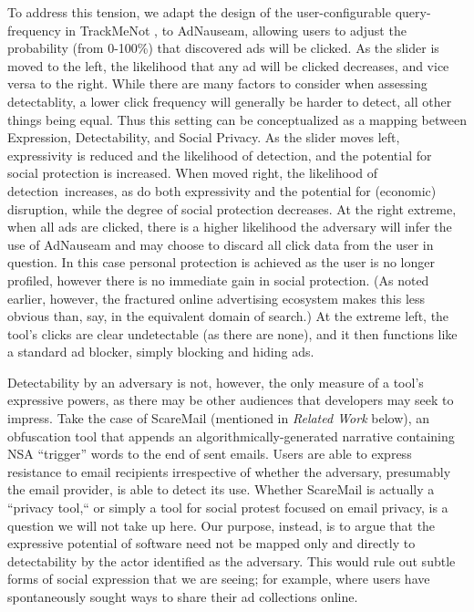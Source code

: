 \documentclass[conference]{IEEEtran}
\begin{document}
To address this tension, we adapt the design of the user-configurable query-frequency in TrackMeNot \cite{Howe-1}, to AdNauseam, allowing users to adjust the probability (from 0-100\%) that discovered ads will be clicked. As the slider is moved to the left, the likelihood that any ad will be clicked decreases, and vice versa to the right. While there are many factors to consider when assessing detectablity, a lower click frequency will generally be harder to detect, all other things being equal. Thus this setting can be conceptualized as a mapping between Expression, Detectability, and Social Privacy. As the slider moves left, expressivity is reduced and the likelihood of detection, and the potential for social protection is increased. When moved right, the likelihood of detection increases, as do both expressivity and the potential for (economic) disruption, while the degree of social protection decreases. At the right extreme, when all ads are clicked, there is a higher likelihood the adversary will infer the use of AdNauseam and may choose to discard all click data from the user in question. In this case personal protection is achieved as the user is no longer profiled, however there is no immediate gain in social protection. (As noted earlier, however, the fractured online advertising ecosystem makes this less obvious than, say, in the equivalent domain of search.) At the extreme left, the tool's clicks are clear undetectable (as there are none), and it then functions like a standard ad blocker, simply blocking and hiding ads.

Detectability by an adversary is not, however, the only measure of a tool’s expressive powers, as there may be other audiences that developers may seek to impress. Take the case of ScareMail (mentioned in \emph{Related Work} below), an obfuscation tool that appends an algorithmically-generated narrative containing NSA “trigger” words to the end of sent emails. Users are able to express resistance to email recipients irrespective of whether the adversary, presumably the email provider, is able to detect its use. Whether ScareMail is actually a “privacy tool,“ or simply a tool for social protest focused on email privacy, is a question we will not take up here. Our purpose, instead, is to argue that the expressive potential of software need not be mapped only and directly to detectability by the actor identified as the adversary. This would rule out subtle forms of social expression that we are seeing; for example, where users have spontaneously sought ways to share their ad collections online.
\end{document}
